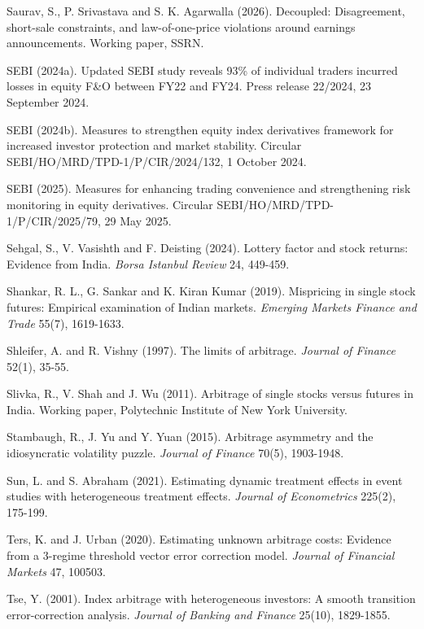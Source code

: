 \begin{description}[leftmargin=1.2em,itemsep=1pt,font=\normalfont]
\item Saurav, S., P. Srivastava and S. K. Agarwalla (2026). Decoupled: Disagreement, short-sale constraints, and law-of-one-price violations around earnings announcements. Working paper, SSRN.
\item SEBI (2024a). Updated SEBI study reveals 93\% of individual traders incurred losses in equity F\&O between FY22 and FY24. Press release 22/2024, 23 September 2024.
\item SEBI (2024b). Measures to strengthen equity index derivatives framework for increased investor protection and market stability. Circular SEBI/HO/MRD/TPD-1/P/CIR/2024/132, 1 October 2024.
\item SEBI (2025). Measures for enhancing trading convenience and strengthening risk monitoring in equity derivatives. Circular SEBI/HO/MRD/TPD-1/P/CIR/2025/79, 29 May 2025.
\item Sehgal, S., V. Vasishth and F. Deisting (2024). Lottery factor and stock returns: Evidence from India. \emph{Borsa Istanbul Review} 24, 449-459.
\item Shankar, R. L., G. Sankar and K. Kiran Kumar (2019). Mispricing in single stock futures: Empirical examination of Indian markets. \emph{Emerging Markets Finance and Trade} 55(7), 1619-1633.
\item Shleifer, A. and R. Vishny (1997). The limits of arbitrage. \emph{Journal of Finance} 52(1), 35-55.
\item Slivka, R., V. Shah and J. Wu (2011). Arbitrage of single stocks versus futures in India. Working paper, Polytechnic Institute of New York University.
\item Stambaugh, R., J. Yu and Y. Yuan (2015). Arbitrage asymmetry and the idiosyncratic volatility puzzle. \emph{Journal of Finance} 70(5), 1903-1948.
\item Sun, L. and S. Abraham (2021). Estimating dynamic treatment effects in event studies with heterogeneous treatment effects. \emph{Journal of Econometrics} 225(2), 175-199.
\item Ters, K. and J. Urban (2020). Estimating unknown arbitrage costs: Evidence from a 3-regime threshold vector error correction model. \emph{Journal of Financial Markets} 47, 100503.
\item Tse, Y. (2001). Index arbitrage with heterogeneous investors: A smooth transition error-correction analysis. \emph{Journal of Banking and Finance} 25(10), 1829-1855.
\end{description}
\vspace{6pt}
